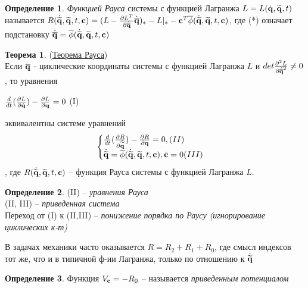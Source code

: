 \documentclass[specialist, subf, href, colorlinks=true, 12pt, times, mtpro, final]{disser}
\theoremstyle{definition}
\newtheorem{defn}{Определение}[section]
\newtheorem{theorem}{Теорема}[section]
\begin{document}
    \begin{defn} 
    { \it Функцией Рауса} системы с функцией Лагранжа $L=L(\dot{\mathbf{q}}, \widetilde{\mathbf{q}}, t)$ называется $R(\dot{\widetilde{\mathbf{q}}}, \widetilde{\mathbf{q}}, t, \mathbf{c}) = (L - \frac{\partial L^T}{\partial \dot{\overline{\mathbf{q}}}} \dot{\overline{\mathbf{q}}})_{*} - L|_{*} - \mathbf{c}^T\overline{\phi}(\dot{\widetilde{\mathbf{q}}}, \widetilde{\mathbf{q}}, t, \mathbf{c})$, где (*) означает подстановку $\dot{\overline{\mathbf{q}}} = \overline{\phi} (\dot{\widetilde{\mathbf{q}}}, \widetilde{\mathbf{q}}, t, \mathbf{c})$
    \end{defn}
    
    \begin{theorem}(\hyperlink {lects.4}{Теорема Рауса})\\
    Если $\overline{\mathbf{q}}$ - циклические координаты системы с функцией Лагранжа $L$ и $det \frac{\partial^2 L}{\partial \dot{\overline{\mathbf{q}}}^2} \neq 0$, то уравнения 
    \begin{center}
    $\frac{d}{dt} (\frac{\partial L}{\partial \dot{\mathbf{q}}}) - \frac{\partial L}{\partial \mathbf{q}} = 0$   (I)
    \end{center}
    эквивалентны системе уравнений
    \begin{equation*}
 		\begin{cases}
  			 \frac{d}{dt}(\frac{\partial R}{\partial \dot{\widetilde{\mathbf{q}}}}) - \frac{\partial R}{\partial \mathbf{q}} = 0,   (II)
   				\\
  			 \dot{\widetilde{\mathbf{q}}} = \overline{\phi} (\dot{\widetilde{\mathbf{q}}}, \widetilde{\mathbf{q}}, t, \mathbf{c}), \dot{\mathbf{c}} = 0  (III)
  				
		\end{cases}
	\end{equation*}, где $R(\dot{\widetilde{\mathbf{q}}}, \widetilde{\mathbf{q}}, t, \mathbf{c})$ \--- функция Рауса системы с функцией Лагранжа $L$.
    \end{theorem}
    
    \begin{defn} 
    (II) \--- { \it уравнения Рауса}\\
    (II, III) \--- {\it приведенная система}\\
    Переход от (I)  к (II,III) \--- {\it понижение порядка по Раусу (игнорирование циклических к-т)}
    \end{defn}
    
    В задачах механики часто оказывается $R= R_2+R_1+R_0$, где смысл индексов тот же, что и в типичной ф-ии Лагранжа, только по отношению к $\dot{\widetilde{\mathbf{q}}}$
    
      \begin{defn} 
    Функция $V_{\mathbf{c}} = -R_0$ \--- называется {\it приведенным потенциалом}
    \end{defn}
    
\end{document}
